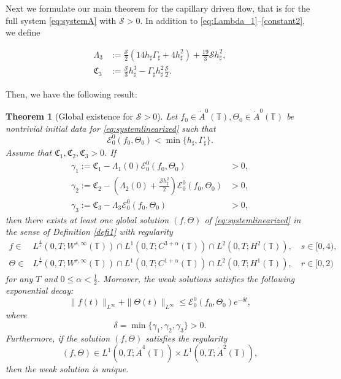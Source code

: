 \documentclass[reqno,11pt]{amsart}
\newcommand{\TT}{{\mathbb T}}
\newcommand{\bh}{h_\sharp}
\newcommand{\bG}{\Gamma_\sharp}
\newtheorem{theorem}{Theorem}
\begin{document}
Next we formulate our main theorem for the capillary driven flow, that is for the full system \eqref{eq:systemA} with $\mathcal S>0$.
In addition to \eqref{eq:Lambda_1}--\eqref{constant2}, we define
{\begin{align}
\Lambda_3&:=\frac{\mathcal{S}}{2} (14\bh\bG +4\bh^2)+\frac{19}{3}\mathcal{S}\bh^2,\label{eq:Lambda_3}\\
\mathfrak{C}_3&:=\frac{\mathcal{S}}{3}\bh^3-\bG\bh^2\frac{\mathcal{S}}{2}\label{constant3}.
\end{align}

Then, we have the following result:
\begin{theorem}[Global existence for $\mathcal{S}>0$]\label{global2} 
Let $f_0\in \dot A^0(\TT), \Theta_0\in \dot A^0(\TT)$ be nontrivial initial data for \eqref{eq:systemlinearized}
such that
$$
\mathscr{E}^0_0(f_0,\Theta_0)<\min\{\bh,\bG\}.
$$
Assume that $\mathfrak{C}_1,\mathfrak{C}_2,\mathfrak{C}_3>0$. If
\begin{align*}
\gamma_1:=\mathfrak{C}_1-\Lambda_1(0)\mathscr{E}_0^0(f_0,\Theta_0)&>0,\\
\gamma_2:=\mathfrak{C}_2-\left(\Lambda_2(0)+\frac{\mathcal{S}\bh^2}{2}\right)\mathscr{E}_0^0(f_0,\Theta_0)&>0,\\
\gamma_3:=\mathfrak{C}_3-\Lambda_3\mathscr{E}_0^0(f_0,\Theta_0)&>0,
\end{align*}
then there exists at least one global solution $(f,\Theta)$ of \eqref{eq:systemlinearized} in the sense of Definition \ref{defi1} with regularity
\begin{align*}
f\in & L^\frac{4}{s}\left(0,T; W^{s,\infty}(\TT)\right)\cap L^{1}\left(0,T;C^{3+\alpha}(\TT)\right) \cap L^2\left(0,T;H^2(\TT)\right),\quad s\in[0,4),\\
\Theta\in & L^\frac{4}{r}\left(0,T; W^{r,\infty}(\TT)\right)\cap L^{1}\left(0,T;C^{1+\alpha}(\TT)\right)\cap L^2\left(0,T;H^1(\TT)\right),\quad r\in[0,2)
\end{align*}
for any $T$ and $0\leq\alpha<\frac{1}{2}$. Moreover, the weak solutions satisfies the following exponential decay:
$$
\|f(t)\|_{L^\infty}+\|\Theta(t)\|_{L^\infty}\leq \mathscr{E}^0_0(f_0,\Theta_0)e^{-\delta t},
$$
where 
\begin{equation}\label{delta}
\delta=\min\{\gamma_1,\gamma_2,\gamma_3\}>0.
\end{equation}
Furthermore, if the solution $(f,\Theta)$ satisfies the regularity
$$
(f,\Theta)\in L^1\left(0,T;\dot{A}^4(\TT)\right)\times L^1\left(0,T;\dot{A}^2(\TT)\right),
$$
then the weak solution is unique.
\end{theorem}

}
\end{document}
